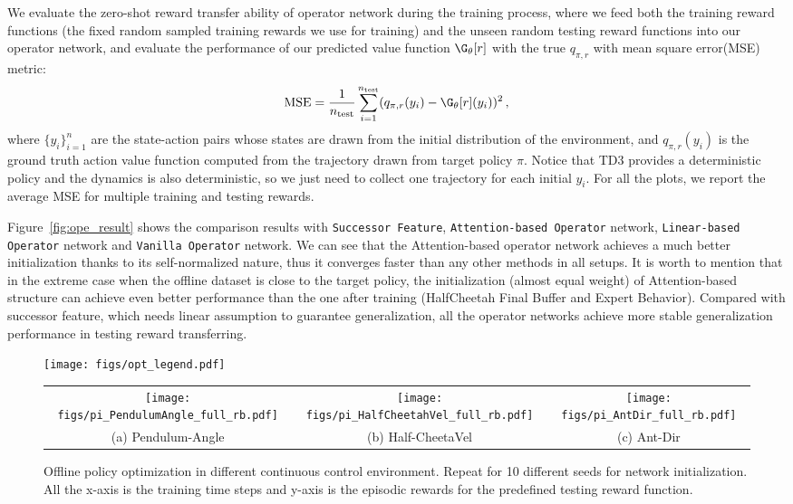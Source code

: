 We evaluate the zero-shot reward transfer ability of operator network during the training process, where we feed both the training reward functions (the fixed random sampled training rewards we use for training) and the unseen random testing reward functions into our operator network, and evaluate the performance of our predicted value function $\G_\theta[r]$ with the true $q_{\pi,r}$ with mean square error(MSE) metric:
$$
\mathrm{MSE} = \frac{1}{n_{\mathrm{test}}}\sum_{i=1}^{n_{\mathrm{test}}} (q_{\pi,r}(y_i) - \G_\theta[r](y_i))^2\,,
$$
where $\{y_i\}_{i=1}^{n}$ are the state-action pairs whose states are drawn from the initial distribution of the environment, and $q_{\pi,r}(y_i)$ is the ground truth action value function computed from the trajectory drawn from target policy $\pi$. 
Notice that TD3 provides a deterministic policy and the dynamics is also deterministic, so we just need to collect one trajectory for each initial $y_i$.
For all the plots, we report the average MSE for multiple training and testing rewards.

Figure~\ref{fig:ope_result} shows the comparison results with {\tt Successor Feature}, {\tt Attention-based Operator} network, {\tt Linear-based Operator} network and {\tt Vanilla Operator} network.
We can see that the Attention-based operator network achieves a much better initialization thanks to its self-normalized nature, thus it converges faster than any other methods in all setups.  
It is worth to mention that in the extreme case when the offline dataset is close to the target policy, the initialization (almost equal weight) of Attention-based structure can achieve even better performance than the one after training (HalfCheetah Final Buffer and Expert Behavior).
Compared with successor feature, which needs linear assumption to guarantee generalization, all the operator networks achieve more stable generalization performance in testing reward transferring.

\newcommand{\newfigsize}{0.3}
\begin{figure}
    \centering
    \texttt{[image: figs/opt\_legend.pdf]}
    \begin{tabular}{ccc}
    \raisebox{0.5em}{\rotatebox{90}{\small Episodic Reward}}
    \texttt{[image: figs/pi\_PendulumAngle\_full\_rb.pdf]} &
    \texttt{[image: figs/pi\_HalfCheetahVel\_full\_rb.pdf]} &
    \texttt{[image: figs/pi\_AntDir\_full\_rb.pdf]}\\
    {\small (a) Pendulum-Angle}  & {\small (b) Half-CheetaVel} & {\small (c) Ant-Dir}\\
    \end{tabular}
    \caption{Offline policy optimization in different continuous control environment. Repeat for 10 different seeds for network initialization. All the x-axis is the training time steps and y-axis is the episodic rewards for the predefined testing reward function.}
    \label{fig:opi_result}
\end{figure}


